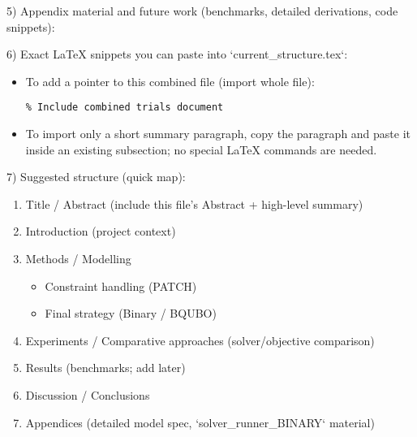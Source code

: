 \documentclass[11pt,a4paper]{article}
\begin{document}
5) Appendix material and future work (benchmarks, detailed derivations, code snippets):

6) Exact LaTeX snippets you can paste into `current_structure.tex`:
\begin{itemize}
    \item To add a pointer to this combined file (import whole file):
    \begin{lstlisting}
% Include combined trials document

    \end{lstlisting}
    \item To import only a short summary paragraph, copy the paragraph and paste it inside an existing subsection; no special LaTeX commands are needed.
\end{itemize}

7) Suggested structure (quick map):
\begin{enumerate}
    \item Title / Abstract (include this file's Abstract + high-level summary)
    \item Introduction (project context)
    \item Methods / Modelling
        \begin{itemize}
            \item Constraint handling (PATCH)
            \item Final strategy (Binary / BQUBO)
        \end{itemize}
    \item Experiments / Comparative approaches (solver/objective comparison)
    \item Results (benchmarks; add later)
    \item Discussion / Conclusions
    \item Appendices (detailed model spec, `solver_runner_BINARY` material)
\end{enumerate}
\end{document}
